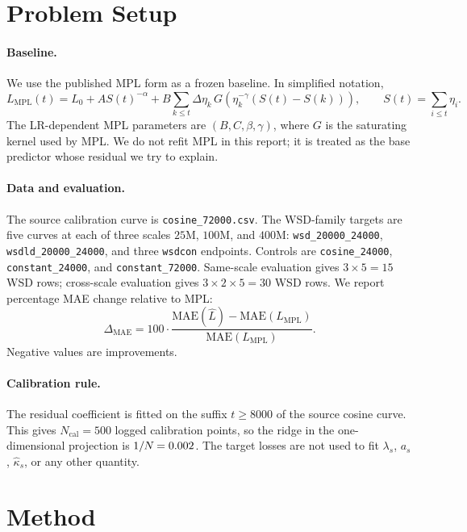 \documentclass{article}
\newcommand{\code}[1]{\texttt{\small #1}}
\newcommand{\MPL}{\mathrm{MPL}}
\begin{document}
\section{Problem Setup}
\paragraph{Baseline.}
We use the published MPL form as a frozen baseline.  In simplified notation,
\begin{equation}\label{eq:mpl}
L_{\MPL}(t)
=L_0+A S(t)^{-\alpha}
+B\sum_{k\le t}\Delta\eta_k\,
G\!\left(\eta_k^{-\gamma}(S(t)-S(k))\right),
\qquad
S(t)=\sum_{i\le t}\eta_i .
\end{equation}
The LR-dependent MPL parameters are \((B,C,\beta,\gamma)\), where \(G\) is the saturating
kernel used by MPL.  We do not refit MPL in this report; it is treated as the base predictor
whose residual we try to explain.

\paragraph{Data and evaluation.}
The source calibration curve is \code{cosine\_72000.csv}.  The WSD-family targets are five
curves at each of three scales \(25\)M, \(100\)M, and \(400\)M:
\code{wsd\_20000\_24000}, \code{wsdld\_20000\_24000}, and three \code{wsdcon} endpoints.
Controls are \code{cosine\_24000}, \code{constant\_24000}, and \code{constant\_72000}.
Same-scale evaluation gives \(3\times5=15\) WSD rows; cross-scale evaluation gives
\(3\times2\times5=30\) WSD rows.  We report percentage MAE change relative to MPL:
\begin{equation}
  \Delta_{\mathrm{MAE}} =
  100\cdot
  \frac{\mathrm{MAE}(\widehat L)-\mathrm{MAE}(L_{\MPL})}
       {\mathrm{MAE}(L_{\MPL})}.
\end{equation}
Negative values are improvements.

\paragraph{Calibration rule.}
The residual coefficient is fitted on the suffix \(t\ge 8000\) of the source cosine curve.
This gives \(N_{\mathrm{cal}}=500\) logged calibration points, so the ridge in the one-dimensional
projection is \(1/N_{\cal}=0.002\).  The target losses are not used to fit
\(\lambda_s\), \(a_s\), \(\widehat\kappa_s\), or any other quantity.

\section{Method}
\end{document}
